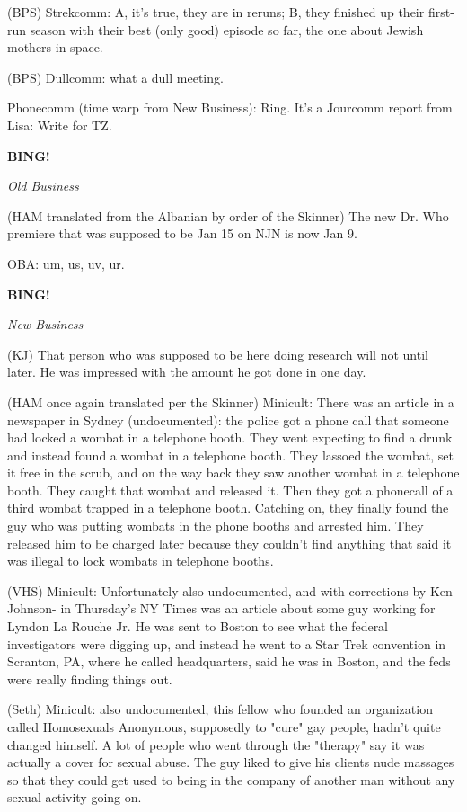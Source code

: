 \documentclass[12pt]{article}
\newcommand{\bing}{{\bf BING!} }
\newcommand{\goto}[1]{\bing \vskip 12pt \centerline{{\em{#1}}}}
\begin{document}
(BPS) Strekcomm: A, it's true, they are in reruns; B, they finished up their first-run season with their best (only good) episode so far, the one about Jewish mothers in space.

(BPS) Dullcomm: what a dull meeting.

Phonecomm (time warp from New Business): Ring. It's a Jourcomm report from Lisa: Write for TZ.

\goto{Old Business}

(HAM translated from the Albanian by order of the Skinner) The new Dr. Who premiere that was supposed to be Jan 15 on NJN is now Jan 9.

OBA: um, us, uv, ur.

\goto{New Business}

(KJ) That person who was supposed to be here doing research will not until later. He was impressed with the amount he got done in one day.

(HAM once again translated per the Skinner) Minicult: There was an article in a newspaper in Sydney (undocumented): the police got a phone call that someone had locked a wombat in a telephone booth. They went expecting to find a drunk and instead found a wombat in a telephone booth. They lassoed the wombat, set it free in the scrub, and on the way back they saw another wombat in a telephone booth. They caught that wombat and released it. Then they got a phonecall of a third wombat trapped in a telephone booth. Catching on, they finally found the guy who was putting wombats in the phone booths and arrested him. They released him to be charged later because they couldn't find anything that said it was illegal to lock wombats in telephone booths.

(VHS) Minicult: Unfortunately also undocumented, and with corrections by Ken Johnson- in Thursday's NY Times was an article about some guy working for Lyndon La Rouche Jr. He was sent to Boston to see what the federal investigators were digging up, and instead he went to a Star Trek convention in Scranton, PA, where he called headquarters, said he was in Boston, and the feds were really finding things out.

(Seth) Minicult: also undocumented, this fellow who founded an organization called Homosexuals Anonymous, supposedly to "cure" gay people, hadn't quite changed himself. A lot of people who went through the "therapy" say it was actually a cover for sexual abuse. The guy liked to give his clients nude massages so that they could get used to being in the company of another man without any sexual activity going on.
\end{document}
